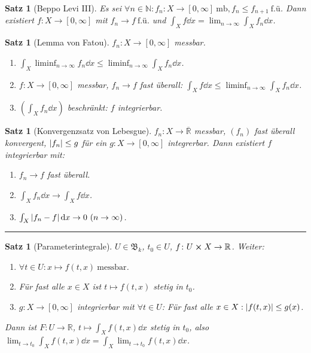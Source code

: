 \documentclass[a4paper]{article}
\newcounter{Sec}
\theoremstyle{marginbreak}
\newtheorem{satz}[definition]{Satz}
\newcommand{\sep}{%
	\rule{\textwidth}{0.3pt}%
	\stepcounter{Sec}%
	}
\newcommand{\en}{~(n\to\infty)}
\newcommand{\R}{\mathbb{R}}
\newcommand{\B}{\mathfrak{B}}
\begin{document}
	\begin{satz}[Beppo Levi III]
		Es sei $\forall n\in\mathbb{N}: f_n\colon X\to[0,\infty]~\text{mb}, f_n\leq f_{n+1}~\text{f.ü}$.
		Dann existiert $f\colon X\to[0,\infty]$ mit $f_n\to f~\text{f.ü.}$ und $\int_Xf\dd{x}=\lim_{n\to\infty}\int_Xf_n\dd{x}$.
	\end{satz}
	\begin{satz}[Lemma von Fatou]
		$f_n\colon X\to[0,\infty]$ messbar.
		\begin{enumerate}[label=(\alph*)]
			\item $\int_X\liminf_{n\to\infty}f_n\dd{x}\leq\liminf_{n\to\infty}\int_Xf_n\dd{x}$.
			\item $f\colon X\to[0,\infty]$ messbar, $f_n\to f$ fast überall: $\int_Xf\dd{x}\leq\liminf_{n\to\infty}\int_Xf_n\dd{x}$.
			\item $(\int_Xf_n\dd{x})$ beschränkt: $f$ integrierbar.
		\end{enumerate}
	\end{satz}
	\begin{satz}[Konvergenzsatz von Lebesgue]
		$f_n\colon X\to\overline{\R}$ messbar, $(f_n)$ fast überall konvergent,
		$\abs{f_n}\leq g$ für ein $g\colon X\to[0,\infty]$ integrerbar. Dann existiert $f$ integrierbar mit:
		\begin{enumerate}[label=(\alph*)]
			\item $f_n\to f$ fast überall.
			\item $\int_Xf_n\dd{x}\to\int_Xf\dd{x}$.
			\item $\int_X\abs{f_n-f}\dd{x}\to0\en$.
		\end{enumerate}
	\end{satz}
	\sep
	\begin{satz}[Parameterintegrale]
		$U\in\B_k$, $t_0\in U$, $f\colon U\cross X\to\R$. Weiter:
		\begin{enumerate}[label=(\alph*)]
			\item $\forall t\in U: x\mapsto f(t, x)~\text{messbar}$.
			\item Für fast alle $x\in X$ ist $t\mapsto f(t, x)$ stetig in $t_0$.
			\item $g\colon X\to [0,\infty]$ integrierbar mit $\forall t\in U$:
				Für fast alle $x\in X: \abs{f(t, x)}\leq g(x)$.
		\end{enumerate}
		Dann ist $F\colon U\to\R$, $t\mapsto\int_Xf(t, x)\dd{x}$ stetig in $t_0$,
		also $\lim_{t\to t_0}\int_Xf(t, x)\dd{x} = \int_X\lim_{t\to t_0}f(t, x)\dd{x}$.
	\end{satz}
\end{document}
